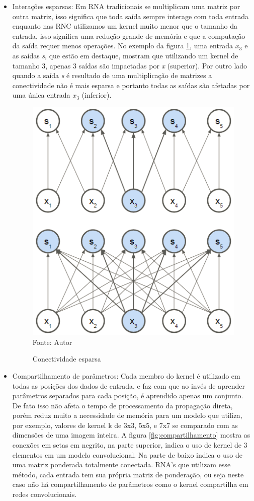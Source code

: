 \documentclass[
	12pt,				%
    oneside,			%
	a4paper,			%
	english,			%
	french,				%
	spanish,			%
	brazil,				%
	]{abntex2}
\begin{document}
\begin{itemize}
    \item Interações esparsas: Em RNA tradicionais se multiplicam uma matriz por outra matriz, isso significa que toda saída sempre interage com toda entrada enquanto nas RNC utilizamos um kernel muito menor que o tamanho da entrada, isso significa uma redução grande de memória e que a computação da saída requer menos operações. No exemplo da figura \ref{fig:esparso}, uma entrada \textit{$x_3$} e as saídas \textit{s}, que estão em destaque, mostram que utilizando um kernel de tamanho 3, apenas 3 saídas são impactadas por \textit{x} (superior). Por outro lado quando a saída \textit{s} é resultado de uma multiplicação de matrizes a conectividade não é mais esparsa e portanto todas as saídas são afetadas por uma única entrada \textit{$x_3$} (inferior).
    
\begin{figure}[H]
    \centering
    \caption{Conectividade esparsa}
    \includegraphics[scale=1]{esparso1}\\
    Fonte: Autor\hfill
    \label{fig:esparso}
\end{figure}
    
        \item Compartilhamento de parâmetros: Cada membro do kernel é utilizado em todas as posições dos dados de entrada, e faz com que ao invés de aprender parâmetros separados para cada posição, é aprendido apenas um conjunto. De fato isso não afeta o tempo de processamento da propagação direta, porém reduz muito a necessidade de memória para um modelo que utiliza, por exemplo, valores de kernel k de 3x3, 5x5, e 7x7 se comparado com as dimensões de uma imagem inteira. A figura \ref{fig:compartilhamento} mostra as conexões em setas em negrito, na parte superior, indica o uso de kernel de 3 elementos em um modelo convolucional. Na parte de baixo indica o uso de uma matriz ponderada totalmente conectada. RNA's que utilizam esse método, cada entrada tem sua própria matriz de ponderação, ou seja neste caso não há compartilhamento de parâmetros como o kernel compartilha em redes convolucionais.
 

\end{itemize}
\end{document}
